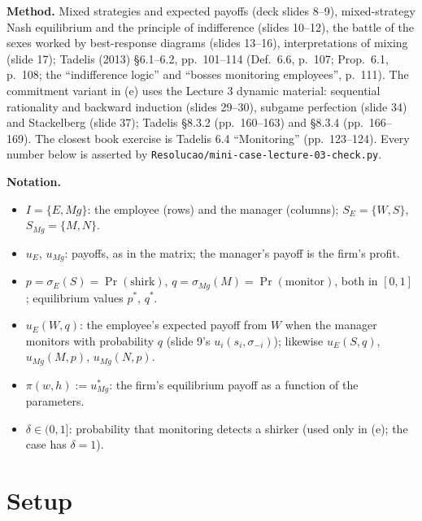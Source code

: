 \documentclass[11pt,a4paper]{article}
\newenvironment{notacao}{\par\smallskip\noindent\textbf{Notation.}\begin{itemize}[leftmargin=1.4em,topsep=1pt,itemsep=0pt]\small}{\end{itemize}}
\begin{document}
\textbf{Method.} Mixed strategies and expected payoffs (deck slides 8--9), mixed-strategy Nash
equilibrium and the principle of indifference (slides 10--12), the battle of the sexes worked by
best-response diagrams (slides 13--16), interpretations of mixing (slide 17); Tadelis (2013)
\S6.1--6.2, pp.~101--114 (Def.~6.6, p.~107; Prop.~6.1, p.~108; the ``indifference logic'' and
``bosses monitoring employees'', p.~111). The commitment variant in (e) uses the Lecture 3 dynamic
material: sequential rationality and backward induction (slides 29--30), subgame perfection (slide
34) and Stackelberg (slide 37); Tadelis \S8.3.2 (pp.~160--163) and \S8.3.4 (pp.~166--169). The
closest book exercise is Tadelis 6.4 ``Monitoring'' (pp.~123--124). Every number below is asserted
by \texttt{Resolucao/mini-case-lecture-03-check.py}.

\begin{notacao}
  \item $I = \{E, M\!g\}$: the employee (rows) and the manager (columns); $S_E = \{W, S\}$,
        $S_{M\!g} = \{M, N\}$.
  \item $u_E$, $u_{M\!g}$: payoffs, as in the matrix; the manager's payoff is the firm's profit.
  \item $p = \sigma_E(S) = \Pr(\text{shirk})$, $q = \sigma_{M\!g}(M) = \Pr(\text{monitor})$, both in
        $[0, 1]$; equilibrium values $p^*$, $q^*$.
  \item $u_E(W, q)$: the employee's expected payoff from $W$ when the manager monitors with probability
        $q$ (slide 9's $u_i(s_i, \sigma_{-i})$); likewise $u_E(S, q)$, $u_{M\!g}(M, p)$, $u_{M\!g}(N, p)$.
  \item $\pi(w, h) := u_{M\!g}^*$: the firm's equilibrium payoff as a function of the parameters.
  \item $\delta \in (0, 1]$: probability that monitoring detects a shirker (used only in (e); the case
        has $\delta = 1$).
\end{notacao}

\section*{Setup}
\end{document}

